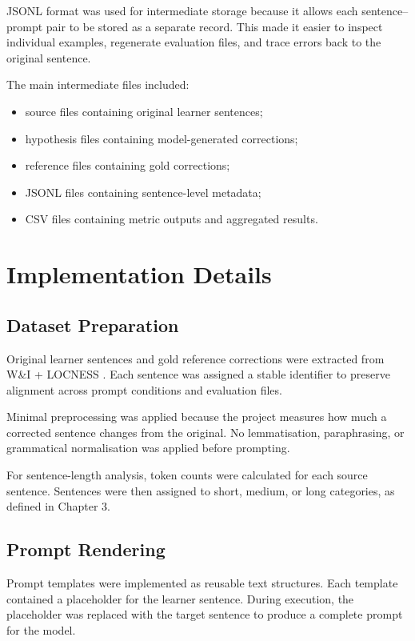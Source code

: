 JSONL format was used for intermediate storage because it allows each sentence--prompt pair to be stored as a separate record. This made it easier to inspect individual examples, regenerate evaluation files, and trace errors back to the original sentence.

The main intermediate files included:

\begin{itemize}
    \item source files containing original learner sentences;
    \item hypothesis files containing model-generated corrections;
    \item reference files containing gold corrections;
    \item JSONL files containing sentence-level metadata;
    \item CSV files containing metric outputs and aggregated results.
\end{itemize}

\section{Implementation Details}

\subsection{Dataset Preparation}

Original learner sentences and gold reference corrections were extracted from W\&I + LOCNESS \cite{bryant-etal-2019-bea}. Each sentence was assigned a stable identifier to preserve alignment across prompt conditions and evaluation files.

Minimal preprocessing was applied because the project measures how much a corrected sentence changes from the original. No lemmatisation, paraphrasing, or grammatical normalisation was applied before prompting.

For sentence-length analysis, token counts were calculated for each source sentence. Sentences were then assigned to short, medium, or long categories, as defined in Chapter 3.

\subsection{Prompt Rendering}

Prompt templates were implemented as reusable text structures. Each template contained a placeholder for the learner sentence. During execution, the placeholder was replaced with the target sentence to produce a complete prompt for the model.

